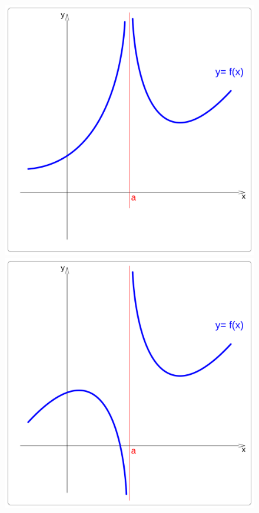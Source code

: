 \begin{figure}[hbp]
\includegraphics[scale=0.06]{img/Funs/2f4}
\includegraphics[scale=0.06]{img/Funs/2f5}

\end{figure}
